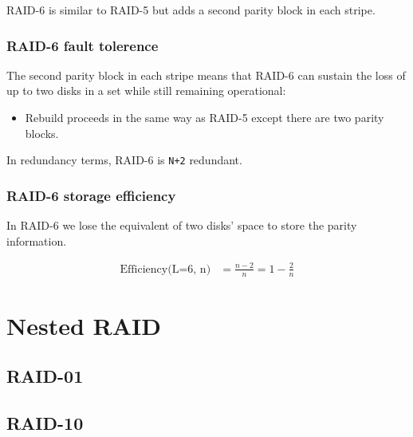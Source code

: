 RAID-6 is similar to RAID-5 but adds a second parity block in each
stripe.


\subsubsection{RAID-6 fault tolerence}
\label{sec:raid-6-fault-tolerence}

The second parity block in each stripe means that RAID-6 can sustain the
loss of up to two disks in a set while still remaining operational:

\begin{itemize}

\item
  Rebuild proceeds in the same way as RAID-5 except there are two parity
  blocks.
\end{itemize}

In redundancy terms, RAID-6 is \texttt{N+2} redundant.

\subsubsection{RAID-6 storage efficiency}
\label{sec:raid-6-storage-efficiency}

In RAID-6 we lose the equivalent of two disks' space to store the parity
information.

\begin{align}
  \mbox{Efficiency(L=6, n)}  & =  \frac{n - 2}{n}  =  1 - \frac{2}{n} \label{eq:raid-6-storage-efficiency} 
\end{align}

\section{Nested RAID}
\label{sec:nested-raid}

\subsection{RAID-01}
\label{sec:raid-01}


\subsection{RAID-10}
\label{sec:raid-10}


